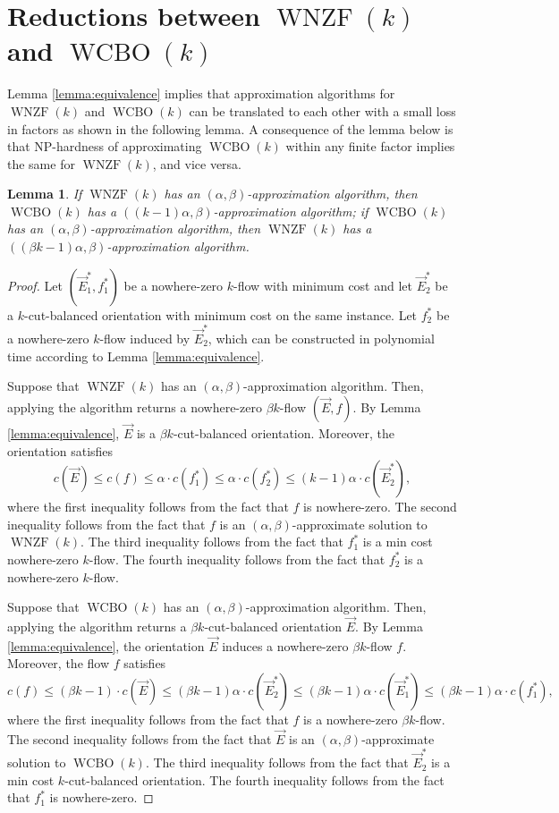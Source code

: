 \documentclass[11pt]{article}
\newtheorem{lemma}[theorem]{Lemma}
\begin{document}
\section{Reductions between $\operatorname{WNZF}(k)$ and $\operatorname{WCBO}(k)$}\label{sec:reduction}
Lemma \ref{lemma:equivalence} implies that approximation algorithms for $\operatorname{WNZF}(k)$ and $\operatorname{WCBO}(k)$ can be translated to each other with a small loss in factors as shown in the following lemma. A consequence of the lemma below is that NP-hardness of approximating $\operatorname{WCBO}(k)$ within any finite factor implies the same for $\operatorname{WNZF}(k)$, and vice versa.
\begin{lemma}\label{lemma:approx_translate}
    If $\operatorname{WNZF}(k)$ has an $(\alpha,\beta)$-approximation algorithm, then $\operatorname{WCBO}(k)$ has a $((k-1)\alpha,\beta)$-approximation algorithm; if $\operatorname{WCBO}(k)$ has an $(\alpha,\beta)$-approximation algorithm, then $\operatorname{WNZF}(k)$ has a $((\beta k-1)\alpha,\beta)$-approximation algorithm.
\end{lemma}
\begin{proof}
    Let $(\vec{E}_1^*,f_1^*)$ be a nowhere-zero $k$-flow with minimum cost and let $\vec{E}_2^*$ be a $k$-cut-balanced orientation with minimum cost on the same instance. Let $f_2^*$ be a nowhere-zero $k$-flow induced by $\vec{E}_2^*$, which can be constructed in polynomial time according to Lemma \ref{lemma:equivalence}.

Suppose that $\operatorname{WNZF}(k)$ has an $(\alpha,\beta)$-approximation algorithm. Then, applying the algorithm returns a nowhere-zero $\beta k$-flow $(\vec{E},f)$. By Lemma \ref{lemma:equivalence}, $\vec{E}$ is a $\beta k$-cut-balanced orientation. Moreover, the orientation satisfies
    \[
    c(\vec{E})\leq c(f)\leq \alpha \cdot c(f_1^*)\leq \alpha \cdot c(f_2^*)\leq (k-1)\alpha \cdot c(\vec{E}_2^*),
    \]
    where the first inequality follows from the fact that $f$ is nowhere-zero. The second inequality follows from the fact that $f$ is an $(\alpha,\beta)$-approximate solution to $\operatorname{WNZF}(k)$. The third inequality follows from the fact that $f_1^*$ is a min cost nowhere-zero $k$-flow. The fourth inequality follows from the fact that $f_2^*$ is a nowhere-zero $k$-flow.

Suppose that $\operatorname{WCBO}(k)$ has an $(\alpha,\beta)$-approximation algorithm. Then, applying the algorithm returns a $\beta k$-cut-balanced orientation $\vec{E}$. By Lemma \ref{lemma:equivalence}, the orientation $\vec{E}$ induces a nowhere-zero $\beta k$-flow $f$. Moreover, the flow $f$ satisfies
 \[
    c(f)\leq (\beta k-1)\cdot c(\vec{E})\leq (\beta k-1)\alpha \cdot c(\vec{E}_2^*)\leq (\beta k-1)\alpha \cdot c(\vec{E}_1^*)\leq (\beta k-1)\alpha \cdot c(f_1^*),
    \]
    where the first inequality follows from the fact that $f$ is a nowhere-zero $\beta k$-flow. The second inequality follows from the fact that $\vec{E}$ is an $(\alpha,\beta)$-approximate solution to $\operatorname{WCBO}(k)$. The third inequality follows from the fact that $\vec{E}_2^*$ is a min cost $k$-cut-balanced orientation. The fourth inequality follows from the fact that $f_1^*$ is nowhere-zero.
\end{proof}
\end{document}
